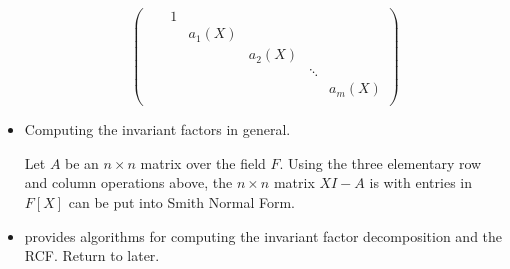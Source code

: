 \documentclass[../notes.tex]{subfiles}
\begin{document}
\begin{itemize}
\begin{equation*}
\begin{pmatrix}
            && 1\\
            &&& a_1(X)\\
            &&&& a_2(X)\\
            &&&&& \ddots\\
            &&&&&& a_m(X)\\
        \end{pmatrix}
    \end{equation*}
    \item Computing the invariant factors in general.
    \begin{theorem}\label{trm:12.21}
        Let $A$ be an $n\times n$ matrix over the field $F$. Using the three elementary row and column operations above, the $n\times n$ matrix $XI-A$ is with entries in $F[X]$ can be put into Smith Normal Form.
    \end{theorem}
    \item \textcite{bib:DummitFoote} provides algorithms for computing the invariant factor decomposition and the RCF. Return to later.
\end{itemize}
\end{document}
